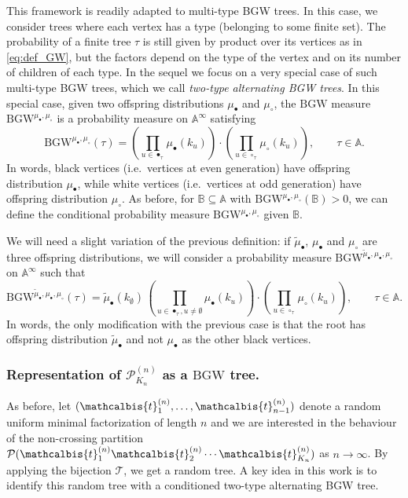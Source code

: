 \documentclass[10pt]{amsart}
\theoremstyle{definition}\newtheorem{defi}[theo]{Definition}\newtheorem{rema}[theo]{Remark}\newtheorem{exam}[theo]{Example}\newtheorem{exem}[theo]{Example}\newtheorem{nota}[theo]{Notation}
\def\PPP{\mathcal P}
\def\tmub{\widetilde{\mu}_{\bullet}}
\def\PKn{\mathcal{P}^{(n)}_{K_{n}}}
\def\mub{\mu_{\bullet}}
\def\muc{\mu_{\circ}}
\newcommand\BGW{\textrm{BGW}}
\def\tb{\mathcalbis{t}}
\begin{document}
This framework is readily adapted to  multi-type BGW trees.
In this case, we consider trees where each vertex has a type (belonging to some finite set).
The probability of a finite tree $\tau$ is still given by product over its vertices as in \eqref{eq:def_GW},
but the factors depend on the type of the vertex and on its number of children of each type.
In the sequel we focus on  a very special case of such multi-type BGW trees, which we call  {\em two-type alternating BGW trees}. In this special case, given two offspring distributions $\mub$ and $\muc$,
the $\mathrm{BGW}$ measure $\BGW^{\mub,\muc}$ is a probability measure on $\mathbb{A} ^{\infty}$ satisfying
\begin{equation}
\label{eq:def_GW2}
\BGW^{\mub,\muc}(\tau) = \left(  \prod_{u \in \bullet_{\tau}} \mub(k_u) \right) \cdot \left(  \prod_{u \in \circ_{\tau}} \muc(k_u) \right), \qquad \tau \in \mathbb{A}.
\end{equation}
In words, black vertices (i.e.\ vertices at even generation) have offspring distribution $\mub$,
while white vertices (i.e.\ vertices at odd generation) have offspring distribution $\muc$.
As before, for $\mathbb B \subseteq \mathbb A$ with $\BGW^{\mub,\muc}(\mathbb B)>0$, we can define
the conditional probability  measure $\BGW^{\mub,\muc}$ given  $\mathbb{B}$.


We will need a slight variation of the previous definition:
if $\tmub$, $\mub$ and $\muc$ are three offspring distributions,
we will consider a probability measure ${\BGW}^{\tmub,\mub,\muc}$ on $\mathbb{A} ^{\infty}$
such that
\begin{equation}
  \label{eq:BGWtilde}
  {\BGW}^{\tmub,\mub,\muc}(\tau)=\tmub(k_\emptyset) \, \left(  \prod_{u \in \bullet_{\tau},u\neq \emptyset} \mub(k_u) \right) \cdot \left(  \prod_{u \in \circ_{\tau}} \muc(k_u) \right), \qquad \tau \in \mathbb{A}.
\end{equation}
In words, the only modification with the previous case is that the
root has offspring distribution $\tmub$ and not $\mub$ as the other black vertices.


\subsubsection{Representation of $\PKn$ as a $\BGW$ tree.}
As before, let $(\tb_{1}^{(n)}, \ldots, \tb_{n-1}^{(n)})$ denote a random uniform minimal factorization of length $n$
and we are interested in the behaviour of the non-crossing partition
$\PPP(\tb_{1}^{(n)} \tb_{2}^{(n)} \cdots \tb_{K_{n}}^{(n)})$ as $n \rightarrow \infty$.
By applying the bijection $\mathcal T$, we get a random tree.
A key idea in this work is to identify this random tree
with a conditioned two-type alternating BGW tree.
\end{document}
